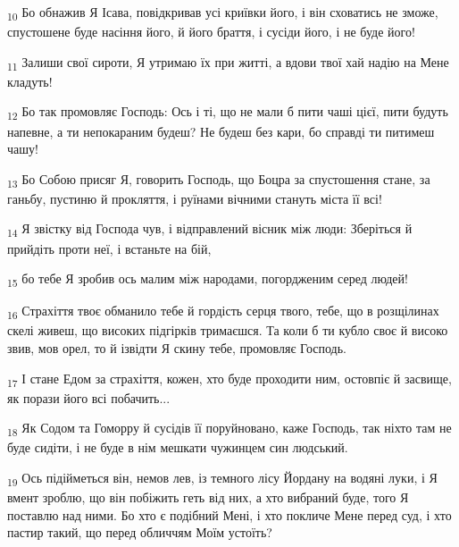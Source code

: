 \begin{tcolorbox}
\textsubscript{10} Бо обнажив Я Ісава, повідкривав усі криївки його, і він сховатись не зможе, спустошене буде насіння його, й його браття, і сусіди його, і не буде його!
\end{tcolorbox}
\begin{tcolorbox}
\textsubscript{11} Залиши свої сироти, Я утримаю їх при житті, а вдови твої хай надію на Мене кладуть!
\end{tcolorbox}
\begin{tcolorbox}
\textsubscript{12} Бо так промовляє Господь: Ось і ті, що не мали б пити чаші цієї, пити будуть напевне, а ти непокараним будеш? Не будеш без кари, бо справді ти питимеш чашу!
\end{tcolorbox}
\begin{tcolorbox}
\textsubscript{13} Бо Собою присяг Я, говорить Господь, що Боцра за спустошення стане, за ганьбу, пустиню й прокляття, і руїнами вічними стануть міста її всі!
\end{tcolorbox}
\begin{tcolorbox}
\textsubscript{14} Я звістку від Господа чув, і відправлений вісник між люди: Зберіться й прийдіть проти неї, і встаньте на бій,
\end{tcolorbox}
\begin{tcolorbox}
\textsubscript{15} бо тебе Я зробив ось малим між народами, погордженим серед людей!
\end{tcolorbox}
\begin{tcolorbox}
\textsubscript{16} Страхіття твоє обманило тебе й гордість серця твого, тебе, що в розщілинах скелі живеш, що високих підгірків тримаєшся. Та коли б ти кубло своє й високо звив, мов орел, то й ізвідти Я скину тебе, промовляє Господь.
\end{tcolorbox}
\begin{tcolorbox}
\textsubscript{17} І стане Едом за страхіття, кожен, хто буде проходити ним, остовпіє й засвище, як порази його всі побачить...
\end{tcolorbox}
\begin{tcolorbox}
\textsubscript{18} Як Содом та Гоморру й сусідів її поруйновано, каже Господь, так ніхто там не буде сидіти, і не буде в нім мешкати чужинцем син людський.
\end{tcolorbox}
\begin{tcolorbox}
\textsubscript{19} Ось підійметься він, немов лев, із темного лісу Йордану на водяні луки, і Я вмент зроблю, що він побіжить геть від них, а хто вибраний буде, того Я поставлю над ними. Бо хто є подібний Мені, і хто покличе Мене перед суд, і хто пастир такий, що перед обличчям Моїм устоїть?
\end{tcolorbox}
